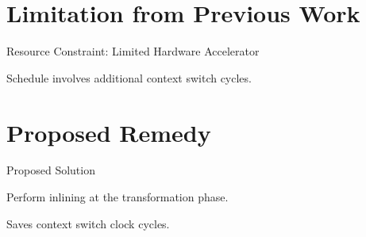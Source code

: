 \documentclass[notes, xcolor=dvipsnames]{beamer}
\begin{document}
    \section{Limitation from Previous Work}
    \begin{frame}{Resource Constraint: Limited Hardware Accelerator}


        \begin{figure}
        \end{figure}

        Schedule involves additional context switch cycles.
        
    \end{frame}

    \section{Proposed Remedy}
    \begin{frame}{Proposed Solution}

        Perform inlining at the transformation phase. 

        Saves context switch clock cycles.
        
    \end{frame}
\end{document}
